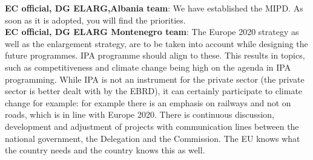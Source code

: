 \textbf{EC official, DG ELARG,Albania team}: We have established the MIPD. As soon as it is adopted, you will find the priorities. \\
\textbf{EC official, DG ELARG Montenegro team}: The Europe 2020 strategy as well as  the enlargement strategy, are to be taken into account while designing the future programmes. IPA programme should align to these.  This results in topics, such as competitiveness and climate change being high on the agenda in IPA programming. While IPA is not an instrument for the private sector (the private sector is better dealt with by the EBRD), it can certainly participate to climate change for example: for example there is an emphasis on railways and not on roads, which is in line with Europe 2020. There is continuous discussion, development and adjustment of projects with communication lines between the national government, the Delegation and the Commission. The EU knows what the country needs and the country knows this as well. \\

